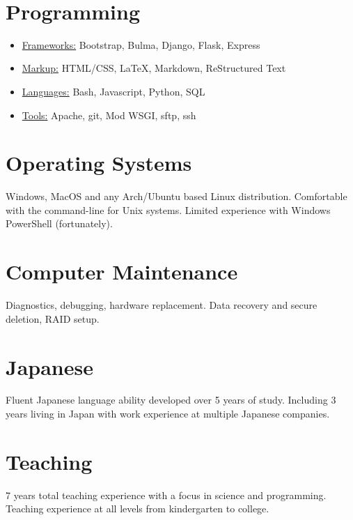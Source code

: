 \documentclass[letterpaper]{easyCV}
\begin{document}
\thispagestyle{empty}		%
\address{Where you live}\\

\begin{sidebar}[Skills]{10.5pt}

\section{Programming}
\begin{itemize}[leftmargin=*, nosep]
    \setlength\itemsep{0.75ex}
    \item \underline{Frameworks:} Bootstrap, Bulma, 
        Django, Flask, Express
    \item \underline{Markup:} HTML/CSS, \LaTeX, 
        Markdown, ReStructured Text
    \item \underline{Languages:} Bash, Javascript, 
        Python, SQL
    \item \underline{Tools:} Apache, git, Mod WSGI,
        sftp, ssh
\end{itemize}

\section{Operating Systems}
Windows, MacOS and any Arch/Ubuntu based Linux distribution. 
Comfortable with the command-line for Unix systems.
Limited experience with Windows PowerShell (fortunately).

\section{Computer Maintenance}
Diagnostics, debugging, hardware replacement.
Data recovery and secure deletion, RAID setup.

\section{Japanese}
Fluent Japanese language ability developed over 
5 years of study. Including 3 years living in 
Japan with work experience at multiple Japanese
companies. 

\section{Teaching}
7 years total teaching experience with a focus in
science and programming. Teaching experience 
at all levels from kindergarten to college.

\end{sidebar}
\end{document}
